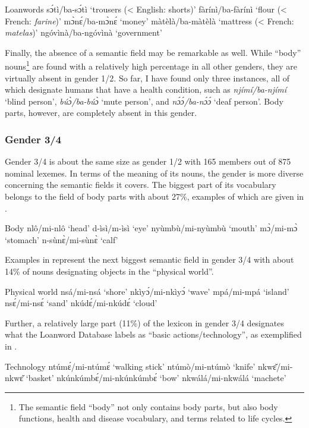 \ea\label{1/2loan} Loanwords
\ea sɔ́tì/ba-sɔ́tì `trousers (<  English: shorts)'
\ex fàrínì/ba-fàrínì `flour (<  French: {\itshape farine})'
\ex mɔ̀nɛ́/ba-mɔ̀nɛ́ `money'
\ex màtèlà/ba-màtèlà `mattress (< French: {\itshape matelas})'
\ex ngóvìnà/ba-ngóvìnà `government'
\z
\z

\noindent Finally, the absence of a semantic field may be remarkable as well. While ``body'' nouns\footnote{The semantic field ``body'' not only contains body parts, but also body functions, health and disease vocabulary, and  terms related to life cycles.} are found with a relatively high percentage in all other genders, they are virtually absent in gender 1/2. So far, I have found only three instances, all of which designate humans that have a health condition, such as {\itshape njímí/ba-njímí} `blind person', {\itshape búɔ̀/ba-búɔ̀} `mute person', and {\itshape nɔ́ɔ́/ba-nɔ́ɔ́} `deaf person'. Body parts, however, are completely absent in this gender.

\subsubsection{Gender 3/4} 
\label{sec:3/4}

Gender 3/4 is about the same size as gender 1/2 with 165 members out of 875 nominal lexemes. In terms of the meaning of its nouns, the gender is more diverse concerning the semantic fields it covers. The biggest part of its vocabulary belongs to the field of body parts with about 27\%, examples of which are given in .

\ea\label{3/4body} Body
\ea nlô/mi-nlô `head'
\ex d-ìsì/m-ìsì `eye'
\ex nyùmbù/mi-nyùmbù `mouth'
\ex mɔ̀/mi-mɔ̀ `stomach'
\ex n-sùnɛ̀/mi-sùnɛ̀ `calf'
\z
\z

\noindent Examples in  represent the next biggest semantic field in gender 3/4 with about 14\% of nouns designating objects in the ``physical world''.

\ea\label{3/4world} Physical world
\ea nsá/mi-nsá `shore'
\ex nkìyɔ́/mi-nkìyɔ́ `wave'
\ex mpá/mi-mpá `island'
\ex nsɛ́/mi-nsɛ́ `sand'
\ex nkúdɛ́/mi-nkúdɛ́ `cloud'
\z
\z

\noindent Further, a relatively large part (11\%) of the lexicon in gender 3/4 designates what the Loanword Database labels as ``basic actions/technology'', as exemplified in .

\ea\label{3/4tech} Technology
\ea ntúmɛ́/mi-ntúmɛ́ `walking stick'
\ex ntúmò/mi-ntúmò `knife'
\ex nkwɛ̌/mi-nkwɛ̌ `basket'
\ex nkúnkúmbɛ́/mi-nkúnkúmbɛ́ `bow'
\ex nkwálá/mi-nkwálá `machete'
\z
\z

